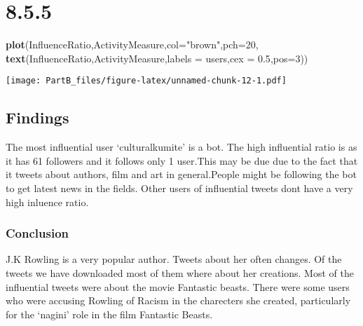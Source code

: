 \documentclass[]{article}
\newenvironment{Shaded}{\begin{snugshade}}{\end{snugshade}}
\newcommand{\KeywordTok}[1]{\textcolor[rgb]{0.13,0.29,0.53}{\textbf{#1}}}
\newcommand{\DataTypeTok}[1]{\textcolor[rgb]{0.13,0.29,0.53}{#1}}
\newcommand{\DecValTok}[1]{\textcolor[rgb]{0.00,0.00,0.81}{#1}}
\newcommand{\FloatTok}[1]{\textcolor[rgb]{0.00,0.00,0.81}{#1}}
\newcommand{\StringTok}[1]{\textcolor[rgb]{0.31,0.60,0.02}{#1}}
\newcommand{\NormalTok}[1]{#1}
\begin{document}
\section{8.5.5}\label{section-2}

\begin{Shaded}
\begin{Highlighting}[]
\KeywordTok{plot}\NormalTok{(InfluenceRatio,ActivityMeasure,}\DataTypeTok{col=}\StringTok{"brown"}\NormalTok{,}\DataTypeTok{pch=}\DecValTok{20}\NormalTok{,}
     \KeywordTok{text}\NormalTok{(InfluenceRatio,ActivityMeasure,}\DataTypeTok{labels =}\NormalTok{ users,}\DataTypeTok{cex =} \FloatTok{0.5}\NormalTok{,}\DataTypeTok{pos=}\DecValTok{3}\NormalTok{))}
\end{Highlighting}
\end{Shaded}

\texttt{[image: PartB\_files/figure-latex/unnamed-chunk-12-1.pdf]}

\subsection{Findings}\label{findings}

The most influential user `culturalkumite' is a bot. The high
influential ratio is as it has 61 followers and it follows only 1
user.This may be due due to the fact that it tweets about authors, film
and art in general.People might be following the bot to get latest news
in the fields. Other users of influential tweets dont have a very high
inluence ratio.

\subsubsection{Conclusion}\label{conclusion}

J.K Rowling is a very popular author. Tweets about her often changes. Of
the tweets we have downloaded most of them where about her creations.
Most of the influential tweets were about the movie Fantastic beasts.
There were some users who were accusing Rowling of Racism in the
charecters she created, particularly for the `nagini' role in the film
Fantastic Beasts.
\end{document}
